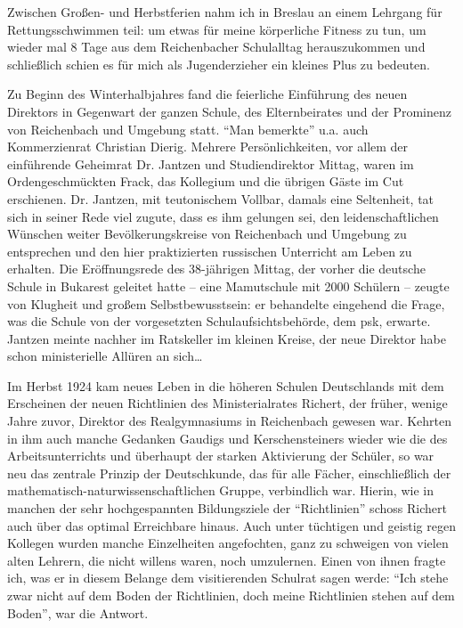 Zwischen Großen- und Herbstferien nahm ich in Breslau an einem Lehrgang für Rettungsschwimmen teil: um etwas für meine körperliche Fitness zu tun, um wieder mal 8 Tage aus dem Reichenbacher Schulalltag herauszukommen und schließlich schien es für mich als Jugenderzieher ein kleines Plus zu bedeuten.

Zu Beginn des Winterhalbjahres fand die feierliche Einführung des neuen Direktors in Gegenwart der ganzen Schule, des Elternbeirates und der Prominenz von Reichenbach und Umgebung statt. \enquote{Man bemerkte} u.a. auch Kommerzienrat Christian Dierig. Mehrere Persönlichkeiten, vor allem der einführende Geheimrat Dr. Jantzen und Studiendirektor Mittag, waren im Ordengeschmückten Frack, das Kollegium und die übrigen Gäste im Cut erschienen. Dr. Jantzen, mit teutonischem Vollbar, damals eine Seltenheit, tat sich in seiner Rede viel zugute, dass es ihm gelungen sei, den leidenschaftlichen Wünschen weiter Bevölkerungskreise von Reichenbach und Umgebung zu entsprechen und den hier praktizierten russischen Unterricht am Leben zu erhalten. Die Eröffnungsrede des 38-jährigen Mittag, der vorher die deutsche Schule in Bukarest geleitet hatte -- eine Mamutschule mit 2000 Schülern -- zeugte von Klugheit und großem Selbstbewusstsein: er behandelte eingehend die Frage, was die Schule von der vorgesetzten Schulaufsichtsbehörde, dem \ac{psk}, erwarte. Jantzen meinte nachher im Ratskeller im kleinen Kreise, der neue Direktor habe schon ministerielle Allüren an sich\dots

Im Herbst 1924 kam neues Leben in die höheren Schulen Deutschlands mit dem Erscheinen der neuen Richtlinien des Ministerialrates Richert, der früher, wenige Jahre zuvor, Direktor des Realgymnasiums in Reichenbach gewesen war. Kehrten in ihm auch manche Gedanken Gaudigs und Kerschensteiners wieder wie die des Arbeitsunterrichts und überhaupt der starken Aktivierung der Schüler, so war neu das zentrale Prinzip der Deutschkunde, das für alle Fächer, einschließlich der mathematisch-naturwissenschaftlichen Gruppe, verbindlich war. Hierin, wie in manchen der sehr hochgespannten Bildungsziele der \enquote{Richtlinien} schoss Richert auch über das optimal Erreichbare hinaus. Auch unter tüchtigen und geistig regen Kollegen wurden manche Einzelheiten angefochten, ganz zu schweigen von vielen alten Lehrern, die nicht willens waren, noch umzulernen. Einen von ihnen fragte ich, was er in diesem Belange dem visitierenden Schulrat sagen werde: \enquote{Ich stehe zwar nicht auf dem Boden der Richtlinien, doch meine Richtlinien stehen auf dem Boden}, war die Antwort.

